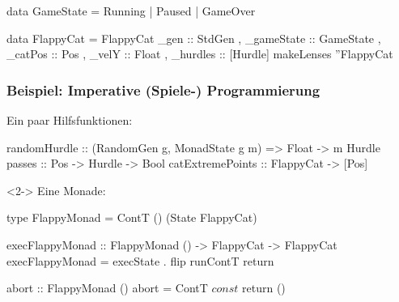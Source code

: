 \documentclass{beamer}
\begin{document}
{\begin{frame}[fragile]
\begin{haskellcode}
data GameState = Running | Paused | GameOver

data FlappyCat =
  FlappyCat
  { _gen :: StdGen
  , _gameState :: GameState
  , _catPos :: Pos
  , _velY :: Float
  , _hurdles :: [Hurdle]
  }
makeLenses ''FlappyCat
\end{haskellcode}
\end{frame}

\begin{frame}[fragile]
  \frametitle{Beispiel: Imperative (Spiele-) Programmierung}
    Ein paar Hilfsfunktionen:
\begin{haskellcode}
randomHurdle :: (RandomGen g, MonadState g m)
             => Float -> m Hurdle
passes :: Pos -> Hurdle -> Bool
catExtremePoints :: FlappyCat -> [Pos]
\end{haskellcode}

  \vspace{1em}
  \begin{visibleenv}<2->
    Eine Monade:
\begin{haskellcode}
type FlappyMonad = ContT () (State FlappyCat)

execFlappyMonad :: FlappyMonad () -> FlappyCat -> FlappyCat
execFlappyMonad = execState . flip runContT return

abort :: FlappyMonad ()
abort = ContT $ const $ return ()
\end{haskellcode}
  \end{visibleenv}
\end{frame}

}
\end{document}

